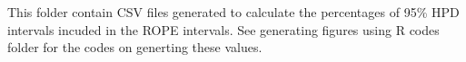 This folder contain CSV files generated to calculate the percentages of 95\% HPD intervals incuded in the ROPE intervals. See generating figures using R codes folder for the codes on generting these values. 

